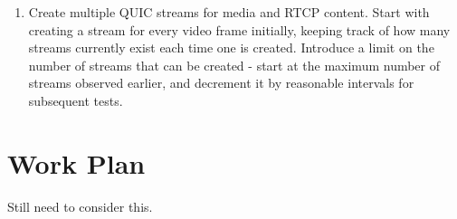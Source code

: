 \documentclass{mprop}
\begin{document}
\begin{enumerate}
  \item Create multiple QUIC streams for media and RTCP content. Start with creating a stream for 
  every video frame initially, keeping track of how many streams currently exist each time one is 
  created. Introduce a limit on the number of streams that can be created - start at the maximum 
  number of streams observed earlier, and decrement it by reasonable intervals for subsequent 
  tests.
\end{enumerate}

\newpage

\section{Work Plan}


Still need to consider this.

\newpage



\end{document}
